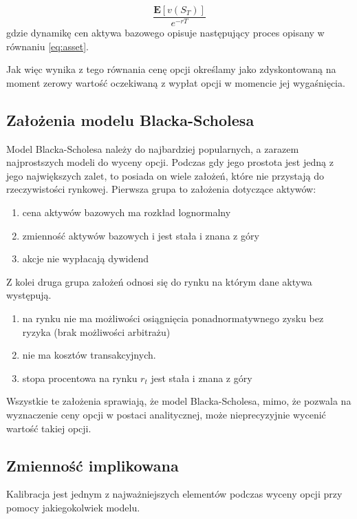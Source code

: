 \documentclass{pracamgr}
\begin{document}
\begin{equation}
\label{eq:discounting}
 \frac{\mathbf{E}[v(S_T)]}{e^{-rT}}
\end{equation}
gdzie dynamikę cen aktywa bazowego opisuje następujący proces opisany w równaniu \ref{eq:asset}.

Jak więc wynika z tego równania cenę opcji określamy jako zdyskontowaną na moment zerowy wartość oczekiwaną z wypłat
opcji w momencie jej wygaśnięcia. 

\subsection{Założenia modelu Blacka-Scholesa} %
\label{sub:zalozenia_modelu_blacka_scholesa}

Model Blacka-Scholesa należy do najbardziej popularnych, a zarazem najprostszych modeli do wyceny opcji. Podczas gdy jego prostota jest jedną z jego największych zalet, to posiada on wiele założeń, które nie przystają do rzeczywistości rynkowej. Pierwsza grupa to założenia dotyczące aktywów:
\begin{enumerate}
\item cena aktywów bazowych ma rozkład lognormalny
\item zmienność aktywów bazowych i jest stała i znana z góry
\item akcje nie wypłacają dywidend
\end{enumerate}
Z kolei druga grupa założeń odnosi się do rynku na którym dane aktywa występują.
\begin{enumerate}
\item na rynku nie ma możliwości osiągnięcia ponadnormatywnego zysku bez ryzyka (brak możliwości arbitrażu)
\item nie ma kosztów transakcyjnych.
\item stopa procentowa na rynku $r_t$ jest stała i znana z góry 
\end{enumerate}

Wszystkie te założenia sprawiają, że model Blacka-Scholesa, mimo, że pozwala na wyznaczenie ceny opcji w postaci analitycznej, może nieprecyzyjnie wycenić wartość takiej opcji.
  
\subsection{Zmienność implikowana} %
\label{sub:zmienno_implikowana} 
Kalibracja jest jednym z najważniejszych elementów podczas wyceny opcji przy pomocy jakiegokolwiek modelu.  
\end{document}
